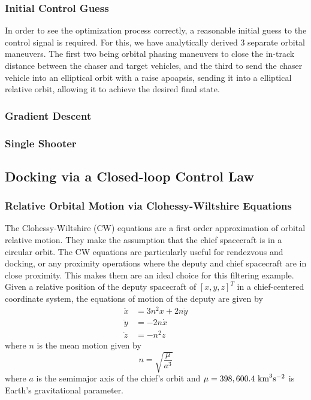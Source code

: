 \documentclass[conf]{new-aiaa}
\begin{document}
\subsubsection{Initial Control Guess}
{\color{red}
In order to see the optimization process correctly, a reasonable initial guess to the control signal is required.  For this, we have analytically derived 3 separate orbital maneuvers.  The first two being orbital phasing maneuvers to close the in-track distance between the chaser and target vehicles, and the third to send the chaser vehicle into an elliptical orbit with a raise apoapsis, sending it into a elliptical relative orbit, allowing it to achieve the desired final state.
}

\subsubsection{Gradient Descent}

\subsubsection{Single Shooter}



\subsection{Docking via a Closed-loop Control Law}
\subsubsection{Relative Orbital Motion via Clohessy-Wiltshire Equations}
The Clohessy-Wiltshire (CW) equations are a first order approximation of orbital relative motion.  They make the assumption that the chief spacecraft is in a circular orbit.  The CW equations are particularly useful for rendezvous and docking, or any proximity operations where the deputy and chief spacecraft are in close proximity.  This makes them are an ideal choice for this filtering example.  Given a relative position of the deputy spacecraft of $\left[x,y,z\right]^T$ in a chief-centered coordinate system, the equations of motion of the deputy are given by \cite{vallado}
\begin{subequations}\begin{align}
\ddot {x} &=  3n^{2}x+2n{\dot {y}}\\
\ddot {y} &= -2n{\dot {x}}\\
\ddot {z} &= -n^{2}z
\end{align}\end{subequations}
where $n$ is the mean motion given by
\begin{equation}
    n =\sqrt {\frac {\mu }{a^{3}}}
\end{equation}
where $a$ is the semimajor axis of the chief's orbit and $\mu = 398,600.4~ \textnormal{km}^3\textnormal{s}^{-2}$ is Earth's gravitational parameter.
\end{document}
